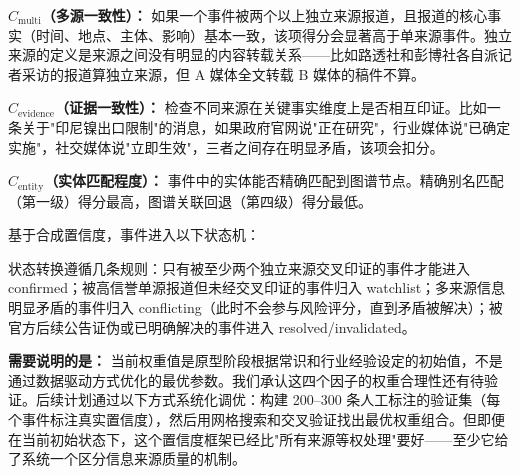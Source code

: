 \documentclass[12pt,a4paper]{ctexart}
\begin{document}
\textbf{\(C_{\text{multi}}\)（多源一致性）：} 如果一个事件被两个以上独立来源报道，且报道的核心事实（时间、地点、主体、影响）基本一致，该项得分会显著高于单来源事件。独立来源的定义是来源之间没有明显的内容转载关系——比如路透社和彭博社各自派记者采访的报道算独立来源，但 A 媒体全文转载 B 媒体的稿件不算。

\textbf{\(C_{\text{evidence}}\)（证据一致性）：} 检查不同来源在关键事实维度上是否相互印证。比如一条关于"印尼镍出口限制"的消息，如果政府官网说"正在研究"，行业媒体说"已确定实施"，社交媒体说"立即生效"，三者之间存在明显矛盾，该项会扣分。

\textbf{\(C_{\text{entity}}\)（实体匹配程度）：} 事件中的实体能否精确匹配到图谱节点。精确别名匹配（第一级）得分最高，图谱关联回退（第四级）得分最低。

基于合成置信度，事件进入以下状态机：

\begin{center}
\end{center}

状态转换遵循几条规则：只有被至少两个独立来源交叉印证的事件才能进入 confirmed；被高信誉单源报道但未经交叉印证的事件归入 watchlist；多来源信息明显矛盾的事件归入 conflicting（此时不会参与风险评分，直到矛盾被解决）；被官方后续公告证伪或已明确解决的事件进入 resolved/invalidated。

\textbf{需要说明的是：} 当前权重值是原型阶段根据常识和行业经验设定的初始值，不是通过数据驱动方式优化的最优参数。我们承认这四个因子的权重合理性还有待验证。后续计划通过以下方式系统化调优：构建 200--300 条人工标注的验证集（每个事件标注真实置信度），然后用网格搜索和交叉验证找出最优权重组合。但即便在当前初始状态下，这个置信度框架已经比"所有来源等权处理"要好——至少它给了系统一个区分信息来源质量的机制。
\end{document}
